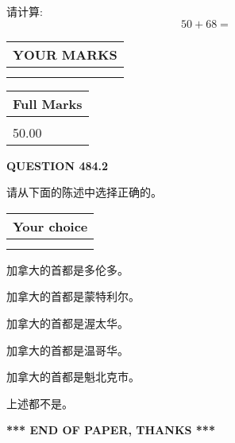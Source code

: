 \documentclass{ctexart}
\begin{document}
  
 
请计算:
\begin{equation}
50 +  %
68 = \nonumber
\end{equation}
 

 

 
  
\vspace{0.2in}
  
\noindent\begin{tabular}{|l|}
\hline
 YOUR MARKS  \\
\hline
 \\ 
 \\ 
\hline
\end{tabular}
\hspace{0.05in} \begin{tabular}{|l|}
\hline
 Full Marks  \\
\hline
 \\ 
50.00 \\
\hline
\end{tabular}
{\textbf{\Large{QUESTION
484.2 
}}}
  
  
请从下面的陈述中选择正确的。
  
  
\noindent\hspace{3.0in} \begin{tabular}{|l|}
\hline
Your choice \\
\hline
 \\ 
 \\ 
\hline
\end{tabular}
  
  
 
 
加拿大的首都是多伦多。
 
 
加拿大的首都是蒙特利尔。
 
 
加拿大的首都是渥太华。
 
 
加拿大的首都是温哥华。
 
 
加拿大的首都是魁北克市。
 
 
 上述都不是。
 
 
   
   
 \vspace{0.2in}
 
   
   
   
   
\vspace{1.0in} 
{\textbf{\large{ *** END OF PAPER, THANKS *** }}} 
   
\end{document}
